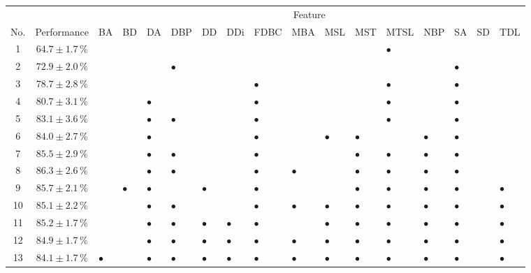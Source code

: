 \documentclass[11pt]{article}
\begin{document}
\begin{sidewaystable}
\begin{tabular}{cclllllllllllllll}
\toprule
 & & \multicolumn{15}{c}{Feature}\\
\cline{3-17}
No. & Performance  & BA & BD & DA & DBP & DD & DDi & FDBC & MBA & MSL & MST & MTSL & NBP & SA & SD & TDL\\
\midrule
1 & $64.7 \pm 1.7\,\%$  &  &  &  &  &  &  &  &  &  &  & $\bullet$ &  &  &  & \\
2 & $72.9 \pm 2.0\,\%$  &  &  &  & $\bullet$ &  &  &  &  &  &  &  &  & $\bullet$ &  & \\
3 & $78.7 \pm 2.8\,\%$  &  &  &  &  &  &  & $\bullet$ &  &  &  & $\bullet$ &  & $\bullet$ &  & \\
4 & $80.7 \pm 3.1\,\%$  &  &  & $\bullet$ &  &  &  & $\bullet$ &  &  &  & $\bullet$ &  & $\bullet$ &  & \\
5 & $83.1 \pm 3.6\,\%$  &  &  & $\bullet$ & $\bullet$ &  &  & $\bullet$ &  &  &  & $\bullet$ &  & $\bullet$ &  & \\
6 & $84.0 \pm 2.7\,\%$  &  &  & $\bullet$ &  &  &  & $\bullet$ &  & $\bullet$ & $\bullet$ &  & $\bullet$ & $\bullet$ &  & \\
7 & $85.5 \pm 2.9\,\%$  &  &  & $\bullet$ & $\bullet$ &  &  & $\bullet$ &  &  & $\bullet$ & $\bullet$ & $\bullet$ & $\bullet$ &  & \\
8 & $86.3 \pm 2.6\,\%$  &  &  & $\bullet$ & $\bullet$ &  &  & $\bullet$ & $\bullet$ &  & $\bullet$ & $\bullet$ & $\bullet$ & $\bullet$ &  & \\
9 & $85.7 \pm 2.1\,\%$  &  & $\bullet$ & $\bullet$ &  & $\bullet$ &  & $\bullet$ &  &  & $\bullet$ & $\bullet$ & $\bullet$ & $\bullet$ &  & $\bullet$\\
10 & $85.1 \pm 2.2\,\%$  &  &  & $\bullet$ & $\bullet$ &  &  & $\bullet$ & $\bullet$ & $\bullet$ & $\bullet$ & $\bullet$ & $\bullet$ & $\bullet$ &  & $\bullet$\\
11 & $85.2 \pm 1.7\,\%$  &  &  & $\bullet$ & $\bullet$ & $\bullet$ & $\bullet$ & $\bullet$ &  & $\bullet$ & $\bullet$ & $\bullet$ & $\bullet$ & $\bullet$ &  & $\bullet$\\
12 & $84.9 \pm 1.7\,\%$  &  &  & $\bullet$ & $\bullet$ & $\bullet$ & $\bullet$ & $\bullet$ & $\bullet$ & $\bullet$ & $\bullet$ & $\bullet$ & $\bullet$ & $\bullet$ &  & $\bullet$\\
13 & $84.1 \pm 1.7\,\%$  & $\bullet$ &  & $\bullet$ & $\bullet$ & $\bullet$ & $\bullet$ & $\bullet$ & $\bullet$ & $\bullet$ & $\bullet$ & $\bullet$ & $\bullet$ & $\bullet$ &  & $\bullet$\\

\end{tabular}
\end{sidewaystable}
\end{document}

